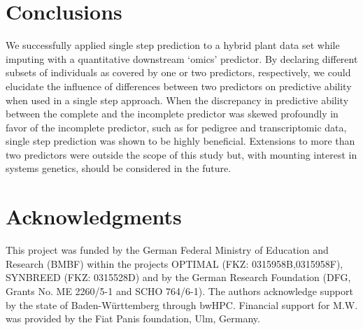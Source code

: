 \documentclass[12pt,titlepage]{article}
\begin{document}
\section*{Conclusions}
We successfully applied single step prediction to a hybrid plant data set 
while imputing with a quantitative downstream `omics' predictor.
By declaring different subsets of individuals as covered by one or two 
predictors, respectively, we could elucidate the influence of differences
between two predictors on predictive ability when used in a single step
approach.
When the discrepancy in predictive ability between the complete and the
incomplete predictor was skewed profoundly in favor of the incomplete predictor,
such as for pedigree and transcriptomic data, single step prediction was shown
to be highly beneficial.
Extensions to more than two predictors were outside the scope of this study
but, with mounting interest in systems genetics, should be considered in the
future.





\section{Acknowledgments}
This project was funded by the German Federal Ministry of Education and 
Research (BMBF) within the projects OPTIMAL (FKZ: 0315958B,0315958F),
SYNBREED (FKZ: 0315528D) and by the German Research Foundation 
(DFG, Grants No. ME 2260/5-1 and SCHO 764/6-1).
The authors acknowledge support by the state of Baden-W{\"u}rttemberg through 
bwHPC\@.
Financial support for M.W. was provided by the Fiat Panis foundation, Ulm,
Germany.



\nolinenumbers


\end{document}
